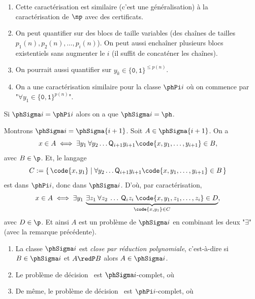 \documentclass[./main]{subfiles}
\begin{document}
  \begin{rmk}
    \begin{enumerate}
      \item Cette caractérisation est similaire (c'est une généralisation) à la caractérisation de $\np$ avec des certificats.
      \item On peut quantifier sur des blocs de taille variables (des chaînes de tailles $p_1(n), p_2(n), \ldots, p_i(n)$).
        On peut aussi enchaîner plusieurs blocs existentiels sans augmenter le $i$ (il suffit de concaténer les chaînes).
      \item On pourrait aussi quantifier sur $y_k \in \{\texttt{0},\texttt{1}\}^{\le p(n)}$.
      \item On a une caractérisation similaire pour la classe $\phPi i$ où on commence par "$\forall y_1 \in \{\texttt{0},\texttt{1}\}^{p(n)}$".
    \end{enumerate}
  \end{rmk}

  \begin{prop}
    Si $\phSigma i = \phPi i$ alors on a que  $\phSigma i = \ph$.
  \end{prop}
  \begin{prv}
    Montrons $\phSigma i = \phSigma {i+1}$.
    Soit $A \in \phSigma {i+1}$.
    On a
    \[
      x \in A \iff
      \exists y_1 \: \forall y_2 \ldots \mathsf{Q}_{i+1} y_{i+1} \code{x, y_1, \ldots, y_{i+1}} \in B
    ,\]
    avec $B \in \p$. Et, le langage
    \[
      C := \mleft\{\, \code{x, y_1} \;\middle|\; \forall y_2 \ldots \mathsf{Q}_{i+1} y_{i+1} \code{x, y_1, \ldots, y_{i+1}}  \in B \,\mright\} 
    \]
    est dans $\phPi i$, donc dans $\phSigma i$.
    D'où, par caractérisation,
     \[
       x \in A \iff \exists y_1 \: \underbrace{\exists z_1 \: \forall z_2 \: \ldots \: \mathsf{Q}_i z_i \: \code{x, y_1, z_1, \ldots, z_i} \in D}_{\code{x, y_1} \in C}
    ,\]
    avec $D \in \p$. Et ainsi $A$ est un problème de $\phSigma i$ en combinant les deux "$\exists$" (avec la remarque précédente).
  \end{prv}

  \begin{rmk}
    \begin{enumerate}
      \item La classe $\phSigma i$ est  \textit{close par réduction polynomiale}, c'est-à-dire si $B \in \phSigma i$ et $A \redP B$ alors $A \in \phSigma i$.
      \item Le problème de décision \pbQBFSigma\ est $\phSigma i$-complet, où
        \showQBFSigma
      \item De même, le problème de décision \pbQBFPi\ est $\phPi i$-complet, où
        \showQBFPi
    \end{enumerate}
  \end{rmk}
\end{document}
